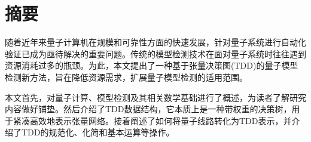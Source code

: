 
\maketitle%
\MAKETITLE%
\makedeclaration%
\intobmk\chapter*{摘\quad 要}%
\setcounter{page}{1}%




随着近年来量子计算机在规模和可靠性方面的快速发展，针对量子系统进行自动化验证已成为亟待解决的重要问题。传统的模型检测技术在面对量子系统时往往遇到资源消耗过多的瓶颈。为此，本文提出了一种基于张量决策图(TDD)的量子模型检测新方法，旨在降低资源需求，扩展量子模型检测的适用范围。

本文首先，对量子计算、模型检测及其相关数学基础进行了概述，为读者了解研究内容做好铺垫。然后介绍了TDD数据结构，它本质上是一种带权重的决策树，用于紧凑高效地表示张量网络。接着阐述了如何将量子线路转化为TDD表示，并介绍了TDD的规范化、化简和基本运算等操作。

